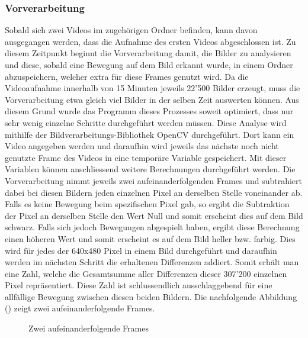 \subsubsection{Vorverarbeitung}
Sobald sich zwei Videos im zugehörigen Ordner befinden, kann davon ausgegangen werden, dass die Aufnahme des ersten Videos abgeschlossen ist. Zu diesem Zeitpunkt beginnt die Vorverarbeitung damit, die Bilder zu analysieren und diese, sobald eine Bewegung auf dem Bild erkannt wurde, in einem Ordner abzuspeichern, welcher extra für diese Frames genutzt wird. Da die Videoaufnahme innerhalb von 15 Minuten jeweils 22'500 Bilder erzeugt, muss die Vorverarbeitung etwa gleich viel Bilder in der selben Zeit auswerten können. Aus diesem Grund wurde das Programm dieses Prozesses soweit optimiert, dass nur sehr wenig einzelne Schritte durchgeführt werden müssen. Diese Analyse wird mithilfe der Bildverarbeitungs-Bibliothek OpenCV durchgeführt. Dort kann ein Video angegeben werden und daraufhin wird jeweils das nächste noch nicht genutzte Frame des Videos in eine temporäre Variable gespeichert. Mit dieser Variablen können anschliessend weitere Berechnungen durchgeführt werden. Die Vorverarbeitung nimmt jeweils zwei aufeinanderfolgenden Frames und subtrahiert dabei bei diesen Bildern jeden einzelnen Pixel an derselben Stelle voneinander ab. Falls es keine Bewegung beim spezifischen Pixel gab, so ergibt die Subtraktion der Pixel an derselben Stelle den Wert Null und somit erscheint dies auf dem Bild schwarz. Falls sich jedoch Bewegungen abgespielt haben, ergibt diese Berechnung einen höheren Wert und somit erscheint es auf dem Bild heller bzw. farbig. Dies wird für jedes der 640x480 Pixel in einem Bild durchgeführt und daraufhin werden im nächsten Schritt die erhaltenen Differenzen addiert. Somit erhält man eine Zahl, welche die Gesamtsumme aller Differenzen dieser 307'200 einzelnen Pixel repräsentiert. Diese Zahl ist schlussendlich ausschlaggebend für eine allfällige Bewegung zwischen diesen beiden Bildern. Die nachfolgende Abbildung () zeigt zwei aufeinanderfolgende Frames.

\begin{figure}[H]
  \centering
  \caption{Zwei aufeinanderfolgende Frames}
  \label{bFrames}
\end{figure}


